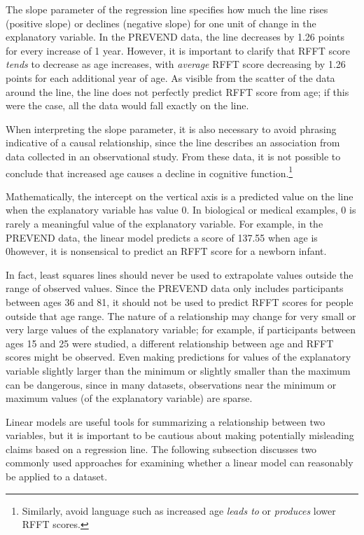 The slope parameter of the regression line specifies how much the line rises (positive slope) or declines (negative slope) for one unit of change in the explanatory variable. In the PREVEND data, the line decreases by 1.26 points for every increase of 1 year. However, it is important to clarify that RFFT score \textit{tends} to decrease as age increases, with \textit{average} RFFT score decreasing by 1.26 points for each additional year of age. As visible from the scatter of the data around the line, the line does not perfectly predict RFFT score from age; if this were the case, all the data would fall exactly on the line.

When interpreting the slope parameter, it is also necessary to avoid phrasing indicative of a causal relationship, since the line describes an association from data collected in an observational study. From these data, it is not possible to conclude that increased age causes a decline in cognitive function.\footnote{Similarly, avoid language such as increased age \textit{leads to} or \textit{produces} lower RFFT scores.} 

Mathematically, the intercept on the vertical axis is a predicted value on the line when the explanatory variable has value 0. In biological or medical examples, 0 is rarely a meaningful value of the explanatory variable. For example, in the PREVEND data, the linear model predicts a score of 137.55 when age is 0\textemdash however, it is nonsensical to predict an RFFT score for a newborn infant. 

In fact, least squares lines should never be used to extrapolate values outside the range of observed values. Since the PREVEND data only includes participants between ages 36 and 81, it should not be used to predict RFFT scores for people outside that age range. The nature of a relationship may change for very small or very large values of the explanatory variable; for example, if participants between ages 15 and 25 were studied, a different relationship between age and RFFT scores might be observed. Even making predictions for values of the explanatory variable slightly larger than the minimum or slightly smaller than the maximum can be dangerous, since in many datasets, observations near the minimum or maximum values (of the explanatory variable) are sparse.

Linear models are useful tools for summarizing a relationship between two variables, but it is important to be cautious about making potentially misleading claims based on a regression line. The following subsection discusses two commonly used approaches for examining whether a linear model can reasonably be applied to a dataset. 


